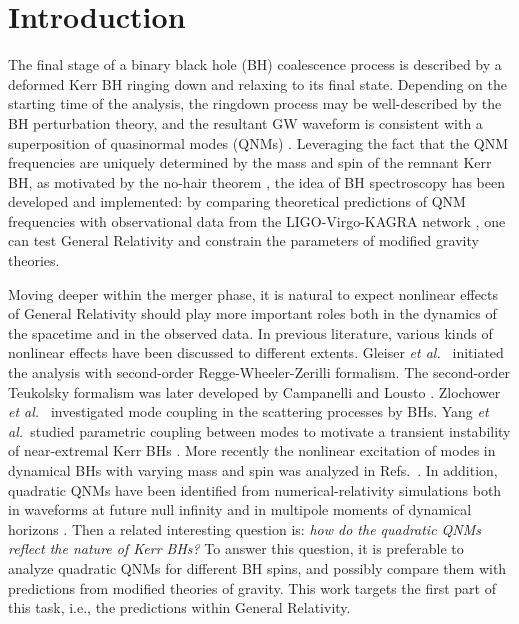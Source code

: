 \documentclass[aps,prd,amsmath,floats,floatfix, twocolumn,
superscriptaddress,nofootinbib,showpacs]{revtex4-1}
\newcommand{\etal}{\textit{et al.\ }}
\begin{document}
\section{Introduction}
\label{sec:introduction}
The final stage of a binary black hole (BH) coalescence process is described by a deformed Kerr BH ringing down and relaxing to its final state.
Depending on the starting time of the analysis, the ringdown process may be well-described by the BH perturbation theory, and the resultant GW waveform is consistent with a superposition of quasinormal modes (QNMs) \cite{Buonanno:2006ui,Berti:2007fi,Giesler:2019uxc}. Leveraging the fact that the QNM frequencies are uniquely determined by the mass and spin of the remnant Kerr BH, as motivated by the no-hair theorem \cite{Carter:NoHair}, the idea of BH spectroscopy \cite{Berti:2005ys,Berti:2016lat,Yang:2017zxs} has been developed and implemented: by comparing theoretical predictions of QNM frequencies with observational data from the LIGO-Virgo-KAGRA network \cite{TheLIGOScientific:2016src,LIGOScientific:2020tif,Abbott:2020mjq,LIGOScientific:2021sio,Berti:2018vdi,Carullo:2019flw,Isi:2019aib,Siegel:2023lxl,Capano:2021etf,Finch:2022ynt,Cotesta:2022pci,Ma:2023vvr,Isi:2019aib,Wang:2023xsy}, one can test General Relativity and constrain the parameters of modified gravity theories.


Moving deeper within the merger phase, it is natural to expect nonlinear effects of General Relativity should play more important roles both in the dynamics of the spacetime and in the observed data. 
In previous literature, various kinds of nonlinear effects have been discussed to different extents. Gleiser \etal \cite{Gleiser:1995gx} initiated the analysis with second-order Regge-Wheeler-Zerilli formalism. The second-order Teukolsky formalism was later developed by Campanelli and Lousto \cite{Campanelli:1998jv}.  Zlochower \etal \cite{Zlochower:2003yh} investigated mode coupling in the scattering processes by BHs. Yang \etal studied parametric coupling between modes to motivate a transient instability of near-extremal Kerr BHs \cite{Yang:2014tla,Yang:2015jja}. More recently the nonlinear excitation of modes in dynamical BHs with varying mass and spin was analyzed in Refs.~\cite{Sberna:2021eui,Redondo-Yuste:2023ipg}. In addition,  quadratic QNMs have been identified from numerical-relativity simulations both in waveforms at future null infinity \cite{Ma:2022wpv,Mitman:2022qdl,Cheung:2022rbm} and in multipole moments of dynamical horizons \cite{Khera:2023oyf}. Then a related interesting question is:  {\it{how do the quadratic QNMs reflect the nature of Kerr BHs?}} To answer this question, it is preferable to analyze quadratic QNMs for different BH spins, and possibly compare them with predictions from modified theories of gravity. This work targets the first part of this task, i.e., the predictions within General Relativity.
\end{document}
